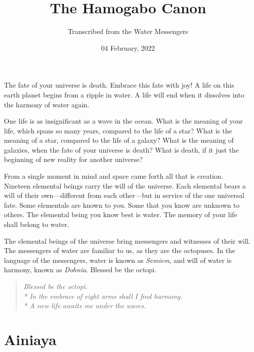 \documentclass[12pt, letterpaper]{report}
\begin{document}
 
\title{The Hamogabo Canon}
 \date{04 February, 2022}
\author{Transcribed from the Water Messengers}  
\maketitle



The fate of your universe is death. Embrace this fate with joy! A life on this earth planet begins from a ripple in water. A life will end when it dissolves into the harmony of water again. 

\vspace{1\baselineskip}
One life is as insignificant as a wave in the ocean. What is the meaning of your life, which spans so many years, compared to the life of a star? What is the meaning of a star, compared to the life of a galaxy? What is the meaning of galaxies, when the fate of your universe is death? What is death, if it just the beginning of new reality for another universe?

\vspace{1\baselineskip}
From a single moment in mind and space came forth all that is creation. Nineteen elemental beings carry the will of the universe. Each elemental bears a will of their own---different from each other---but in service of the one universal fate. Some elementals are known to you.  Some that you know are unknown to others. The elemental being you know best is water. The memory of your life shall belong to water.

\vspace{1\baselineskip}
The elemental beings of the universe bring messengers and witnesses of their will. The messengers of water are familiar to us, as they are the octopuses. In the language of the messengers, water is known as \textit{Semiem}, and will of water is harmony, known as \textit{Dohnia}. Blessed be the octopi.

\begin{quote}
{\textit{
	Blessed be the octopi.\\*
	In the embrace of eight arms shall I find harmony.\\*
	A new life awaits me under the waves. 
}}
\end{quote}

\part{Ainiaya}

\chapter{}
\end{document}
